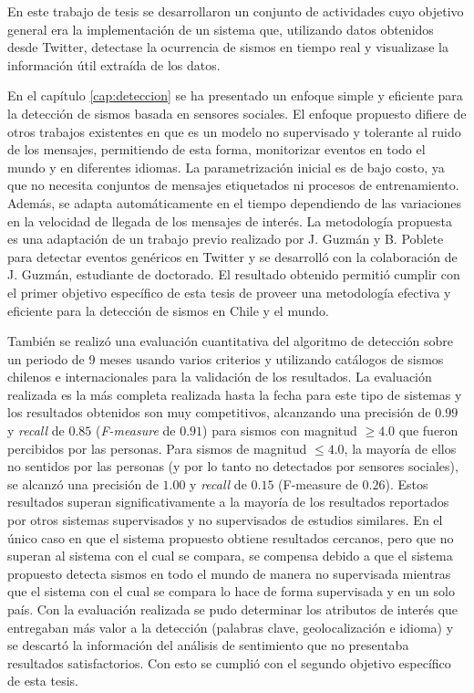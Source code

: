 \begin{conclusion}
\label{cap:conclusion}	


En este trabajo de tesis se desarrollaron un conjunto de actividades cuyo objetivo general era la implementación de un sistema que, utilizando datos obtenidos desde Twitter, detectase la ocurrencia de sismos en tiempo real y visualizase la información útil extraída de los datos.

En el capítulo \ref{cap:deteccion} se ha presentado un enfoque simple y eficiente para la detección de sismos basada en sensores sociales. 
%
El enfoque propuesto difiere de otros trabajos existentes en que es un modelo no supervisado y tolerante al ruido de los mensajes, permitiendo de esta forma, monitorizar eventos en todo el mundo y en diferentes idiomas. 
%
La parametrización inicial es de bajo costo, ya que no necesita conjuntos de mensajes etiquetados ni procesos de entrenamiento. 
%
Además, se adapta automáticamente en el tiempo dependiendo de las variaciones en la velocidad de llegada de los mensajes de interés.
%
La metodología propuesta es una adaptación de un trabajo previo realizado por J. Guzmán y B. Poblete para detectar eventos genéricos en Twitter y se desarrolló con la colaboración de J. Guzmán, estudiante de doctorado. 
%
El resultado obtenido permitió cumplir con el primer objetivo específico de esta tesis de proveer una metodología efectiva y eficiente para la detección de sismos en Chile y el mundo. 


También se realizó una evaluación cuantitativa del algoritmo de detección sobre un periodo de 9 meses usando varios criterios y utilizando catálogos de sismos chilenos e internacionales para la validación de los resultados.  
%
La evaluación realizada es la más completa realizada hasta la fecha para este tipo de sistemas y %
%
los resultados obtenidos son muy competitivos, alcanzando una precisión de $0.99$ y \textit{recall} de $0.85$ (\textit{F-measure} de $0.91$) para sismos con magnitud $\geq 4.0$ que fueron percibidos por las personas. 
%
Para sismos de magnitud $\leq 4.0$, la mayoría de ellos no sentidos por las personas (y por lo tanto no detectados por sensores sociales), se alcanzó una precisión de $1.00$ y \textit{recall} de $0.15$ (F-measure de $0.26$).
%
Estos resultados superan significativamente a la mayoría de los resultados reportados por otros sistemas supervisados y no supervisados de estudios similares.
%
En el único caso en que el sistema propuesto obtiene resultados cercanos, pero que no superan al sistema con el cual se compara, se compensa debido a que el sistema propuesto detecta sismos en todo el mundo de manera no supervisada mientras que el sistema con el cual se compara lo hace de forma supervisada y en un solo país.
%
Con la evaluación realizada se pudo determinar los atributos de interés que entregaban más valor a la detección (palabras clave, geolocalización e idioma) y se descartó la información del análisis de sentimiento que no presentaba resultados satisfactorios. 
% 
Con esto se cumplió con el segundo objetivo específico de esta tesis. 



\end{conclusion}
